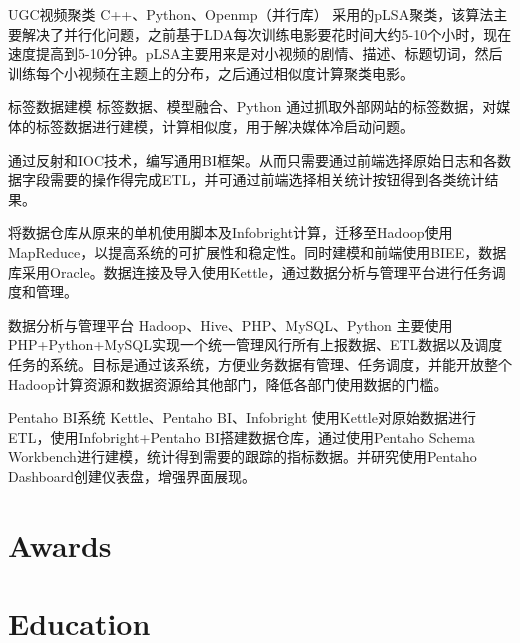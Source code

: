 \documentclass[10pt,a4paper]{moderncv}
\begin{document}
\vspace*{0.2\baselineskip}
{UGC视频聚类}
{C++、Python、Openmp（并行库）}
{}{}
{采用的pLSA聚类，该算法主要解决了并行化问题，之前基于LDA每次训练电影要花时间大约5-10个小时，现在速度提高到5-10分钟。pLSA主要用来是对小视频的剧情、描述、标题切词，然后训练每个小视频在主题上的分布，之后通过相似度计算聚类电影。}

\vspace*{0.2\baselineskip}
{标签数据建模}
{标签数据、模型融合、Python}
{}{}
{通过抓取外部网站的标签数据，对媒体的标签数据进行建模，计算相似度，用于解决媒体冷启动问题。}

\vspace*{0.2\baselineskip}
{通过反射和IOC技术，编写通用BI框架。从而只需要通过前端选择原始日志和各数据字段需要的操作得完成ETL，并可通过前端选择相关统计按钮得到各类统计结果。}

\vspace*{0.2\baselineskip}
{将数据仓库从原来的单机使用脚本及Infobright计算，迁移至Hadoop使用MapReduce，以提高系统的可扩展性和稳定性。同时建模和前端使用BIEE，数据库采用Oracle。数据连接及导入使用Kettle，通过数据分析与管理平台进行任务调度和管理。}

\vspace*{0.2\baselineskip}
{数据分析与管理平台}
{Hadoop、Hive、PHP、MySQL、Python}
{}{}
{主要使用PHP+Python+MySQL实现一个统一管理风行所有上报数据、ETL数据以及调度任务的系统。目标是通过该系统，方便业务数据有管理、任务调度，并能开放整个Hadoop计算资源和数据资源给其他部门，降低各部门使用数据的门槛。}

\vspace*{0.2\baselineskip}
{Pentaho BI系统}
{Kettle、Pentaho BI、Infobright}
{}{}
{使用Kettle对原始数据进行ETL，使用Infobright+Pentaho BI搭建数据仓库，通过使用Pentaho Schema Workbench进行建模，统计得到需要的跟踪的指标数据。并研究使用Pentaho Dashboard创建仪表盘，增强界面展现。}


\section{Awards}

\section{Education}
\end{document}
